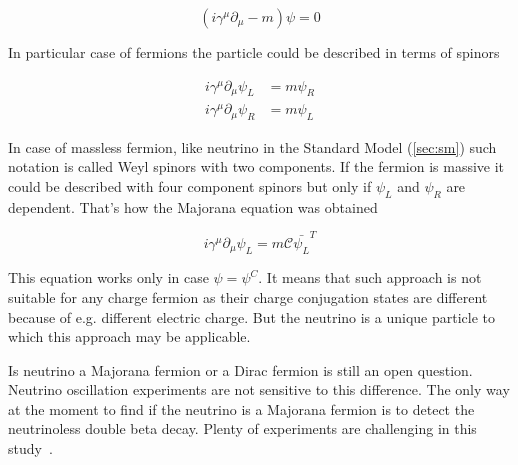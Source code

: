\documentclass[../main.tex]{subfiles}
\begin{document}
\begin{equation}
\left(i\gamma^\mu\partial_\mu-m\right)\psi=0
\end{equation}

In particular case of fermions the particle could be described in terms of spinors

\begin{align}
i\gamma^\mu\partial_\mu\psi_L&=m\psi_R\\ \nonumber
i\gamma^\mu\partial_\mu\psi_R&=m\psi_L
\end{align}

In case of massless fermion, like neutrino in the Standard Model (\autoref{sec:sm}) such notation is called Weyl spinors with two components. If the fermion is massive it could be described with four component spinors but only if $\psi_L$ and $\psi_R$ are dependent. That's how the Majorana equation was obtained

\begin{equation}
i\gamma^\mu\partial_\mu\psi_L=m\mathcal{C}\bar{\psi_L}^{T}
\end{equation}

This equation works only in case $\psi=\psi^C$. It means that such approach is not suitable for any charge fermion as their charge conjugation states are different because of e.g. different electric charge. But the neutrino is a unique particle to which this approach may be applicable.

Is neutrino a Majorana fermion or a Dirac fermion is still an open question. Neutrino oscillation experiments are not sensitive to this difference. The only way at the moment to find if the neutrino is a Majorana fermion is to detect the neutrinoless double beta decay. Plenty of experiments are challenging in this study~\cite{Bilenky2015}.
\end{document}

